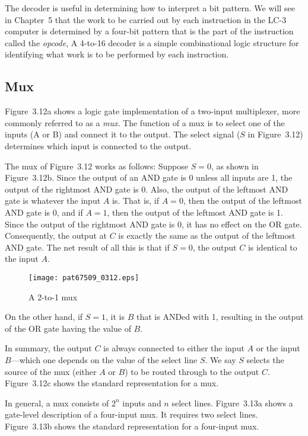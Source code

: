 \documentclass{patt}
\begin{document}
The decoder is useful in determining how to interpret a bit pattern.
We will see in Chapter~5 that the work to be carried out by each
instruction in the LC-3 computer is determined by a four-bit pattern 
that is the part of the instruction called the {\em opcode}, A 4-to-16 
decoder is a simple combinational logic structure for identifying what 
work is to
be performed by each instruction.

\subsection{Mux}
\FloatBarrier

Figure~3.12a shows a logic gate implementation of a two-input
multiplexer, more commonly referred to as a {\em mux}.  The function
of a mux is to select one of the inputs (A or B) and connect it to the output.
The select signal ($S$ in Figure~3.12) determines which input is
connected to the output.    

The mux of
Figure~3.12 works as follows: Suppose $S=0$, as shown in Figure~3.12b.
Since the output of an AND gate is 0 unless all inputs are 1, the
output of the rightmost AND gate is 0.  Also, the output of the
leftmost AND gate is whatever the input $A$ is.  That is, if $A=0$,
then the output of the leftmost AND gate is 0, and if $A=1$, then the
output of the leftmost AND gate is 1.  Since the output of the rightmost 
AND gate is 0, it has
no effect on the OR gate.  Consequently, the output at $C$ is exactly
the same as the output of the leftmost AND gate.  The net result of
all this is that if $S=0$, the output $C$ is identical to the input
$A$.

\begin{figure}
\centerline{\texttt{[image: pat67509\_0312.eps]}}
\caption{A 2-to-1 mux}
\label{fig:mux}
\vspace{-10pt}
\end{figure}

On the other hand, if $S=1$, it is $B$ that is ANDed with 1, resulting
in the output of the OR gate having the value of $B$.

In summary, the output $C$ is always connected to either the input $A$
or the input $B$---which one depends on the value of the select line
$S$.  We say $S$ selects the source of the mux (either $A$ or $B$) to
be routed through to the output $C$. Figure~3.12c shows the standard
representation for a mux.

In general, a mux consists of $2^n$ inputs and $n$ select lines.
Figure~3.13a shows a gate-level description of a four-input mux.
It requires two select lines.  Figure~3.13b shows the standard
representation for a four-input mux.
\end{document}
